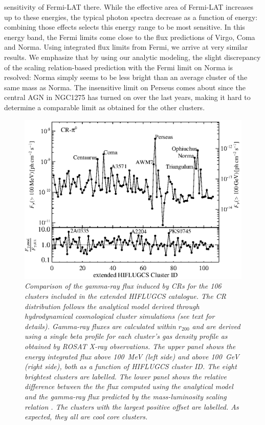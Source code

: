 \documentclass[10pt,aps,pra,reprint,amsmath,amsfonts,amssymb,showpacs,nofootinbib,floatfix]{revtex4-1}
\newcommand{\rvir}{r_{200}}
\begin{document}
sensitivity of Fermi-LAT there. While the effective area of Fermi-LAT
increases up to these energies, the typical photon spectra decrease as
a function of energy: combining those effects selects this energy
range to be most sensitive.  In this energy band, the Fermi limits
come close to the flux predictions of Virgo, Coma and Norma. Using
integrated flux limits from Fermi, we arrive at very similar results.
We emphasize that by using our analytic modeling, the slight
discrepancy of the scaling relation-based prediction with the Fermi
limit on Norma \cite{2010ApJ...717L..71A} is resolved: Norma simply
seems to be less bright than an average cluster of the same mass as
Norma. The insensitive limit on Perseus comes about since the central
AGN in NGC1275 has turned on over the last years, making it hard to
determine a comparable limit as obtained for the other clusters.

\begin{figure}%
\begin{minipage}{2.0\columnwidth}
 \includegraphics[width=0.99\columnwidth]{figures/Flux.comp.CR.eps}
 \caption{\it Comparison of the gamma-ray flux induced by CRs for the
   106 clusters included in the extended HIFLUGCS catalogue.  The CR
   distribution follows the analytical model derived through
   hydrodynamical cosmological cluster simulations \protect
   \cite{2010MNRAS.409..449P} (see text for details).  Gamma-ray
   fluxes are calculated within $\rvir$ and are derived using a single
   beta profile for each cluster's gas density profile as obtained by
   ROSAT X-ray observations. The upper panel shows the energy
   integrated flux above 100~MeV (left side) and above 100~GeV (right
   side), both as a function of HIFLUGCS cluster ID. The eight
   brightest clusters are labelled. The lower panel shows the relative
   difference between the the flux computed using the analytical model
   and the gamma-ray flux predicted by the mass-luminosity scaling
   relation \cite{2010MNRAS.409..449P}. The clusters with the largest
   positive offset are labelled. As expected, they all are cool core
   clusters.}
 \label{fig19}
\end{minipage}
\end{figure}
\end{document}
